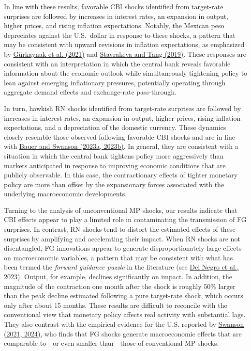 \documentclass[12pt, reqno]{article}
\begin{document}
In line with these results, favorable CBI shocks identified from target-rate surprises are followed by increases in interest rates, an expansion in output, higher prices, and rising inflation expectations. Notably, the Mexican peso depreciates against the U.S.\ dollar in response to these shocks, a pattern that may be consistent with upward revisions in inflation expectations, as emphasized by \hyperlink{Gurkaynak et al. (2021)}{G\"urkaynak et al. (2021)} and \hyperlink{Stavrakeva and Tang (2019)}{Stavrakeva and Tang (2019)}. These responses are consistent with an interpretation in which the central bank reveals favorable information about the economic outlook while simultaneously tightening policy to lean against emerging inflationary pressures, potentially operating through aggregate demand effects and exchange-rate pass-through.

In turn, hawkish RN shocks identified from target-rate surprises are followed by increases in interest rates, an expansion in output, higher prices, rising inflation expectations, and a depreciation of the domestic currency. These dynamics closely resemble those observed following favorable CBI shocks and are in line with \hyperlink{Bauer and Swanson (2023a, 2023b)}{Bauer and Swanson (2023a, 2023b)}. In general, they are consistent with a situation in which the central bank tightens policy more aggressively than markets anticipated in response to improving economic conditions that are publicly observable. In this case, the contractionary effects of tighter monetary policy are more than offset by the expansionary forces associated with the underlying macroeconomic developments.

Turning to the analysis of unconventional MP shocks, our results indicate that CBI effects appear to play a limited role in contaminating the transmission of FG surprises. In contrast, RN shocks tend to distort the estimated effects of these surprises by amplifying and accelerating their impact. When RN shocks are not disentangled, FG innovations appear to generate disproportionately large effects on macroeconomic variables, a pattern that may be consistent with what has been termed the \emph{forward guidance puzzle} in the literature (see \hyperlink{Del Negro et al. (2023)}{Del Negro et al., 2023}). Output, for example, declines significantly on impact. In addition, the magnitude of the contraction one month after the shock is roughly 50\% larger than the peak decline estimated following a pure target-rate shock, which occurs only after about 15 months. These results are difficult to reconcile with the conventional view that monetary policy affects real activity with substantial lags. They also contrast with the empirical evidence for the U.S. reported by \hyperlink{Swanson (2021, 2024)}{Swanson (2021, 2024)}, who finds that FG shocks generate macroeconomic effects that are comparable to—or even smaller than—those of conventional MP shocks.
\end{document}
